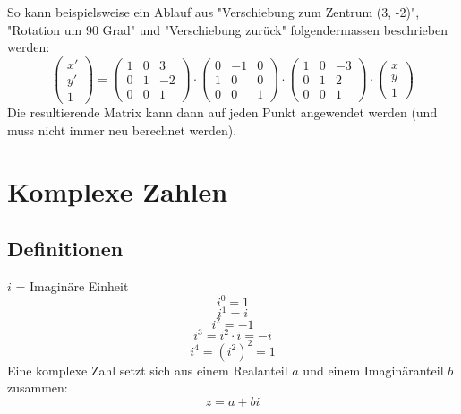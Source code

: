\documentclass{report}
\begin{document}
So kann beispielsweise ein Ablauf aus "Verschiebung zum Zentrum (3, -2)", "Rotation um 90 Grad" und "Verschiebung zurück" folgendermassen beschrieben werden:
\begin{equation}\left(\begin{matrix}x'\\y'\\1\end{matrix}\right) =
\left(\begin{matrix}1 & 0 & 3 \\ 0 & 1 & -2 \\ 0 & 0 & 1\end{matrix}\right) \cdot
\left(\begin{matrix}0 & -1 & 0 \\ 1 & 0 & 0 \\ 0 & 0 & 1\end{matrix}\right) \cdot
\left(\begin{matrix}1 & 0 & -3 \\ 0 & 1 & 2 \\ 0 & 0 & 1\end{matrix}\right) \cdot\left(\begin{matrix}x\\y\\1\end{matrix}\right) \end{equation}
Die resultierende Matrix kann dann auf jeden Punkt angewendet werden (und muss nicht immer neu berechnet werden).
\chapter{Komplexe Zahlen}
\section{Definitionen}
$i$ = Imaginäre Einheit
\begin{equation}i^0 = 1\end{equation}
\begin{equation}i^1 = i\end{equation}
\begin{equation}i^2 = -1\end{equation}
\begin{equation}i^3 = i^2 \cdot i = -i\end{equation}
\begin{equation}i^4 = (i^2)^2 = 1\end{equation}
Eine komplexe Zahl setzt sich aus einem Realanteil $a$ und einem Imaginäranteil $b$ zusammen:
\begin{equation}z = a + bi\end{equation}
\end{document}
